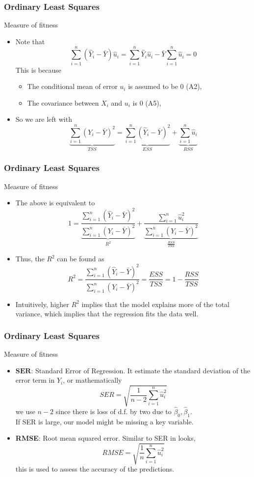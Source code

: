 \documentclass[compress]{beamer}
\begin{document}
\begin{frame}
\frametitle{Ordinary Least Squares}
Measure of fitness
\begin{itemize}
\item Note that 
\[
\sum_{i=1}^n(\hat{Y}_i - \bar{Y}) \hat{u}_i=\sum_{i=1}^n\hat{Y}_i{\hat{u}}_i-\bar{Y}\sum_{i=1}^n\hat{u}_i  =0
\]
This is because 
\begin{itemize}
\item The conditional mean of error $u_i$ is assumed to be 0 (A2), 
\item The covariance between $X_i$ and $u_i$ is 0 (A5), 
\end{itemize}
\item So we are left with
\[
\underbrace{\sum_{i=1}^n (Y_i-\bar{Y})^2}_{TSS}= \underbrace{\sum_{i=1}^n (\hat{Y}_i - \bar{Y})^2}_{ESS}+\underbrace{\sum_{i=1}^n\hat{u}_i}_{RSS} 
\]
\end{itemize}
\end{frame}


\begin{frame}
\frametitle{Ordinary Least Squares}
Measure of fitness
\begin{itemize}
\item The above is equivalent to 
\[
1=\underbrace{\frac{\sum_{i=1}^n (\hat{Y}_i - \bar{Y})^2}{\sum_{i=1}^n (Y_i-\bar{Y})^2}}_{R^2} + \underbrace{\frac{\sum_{i=1}^n\hat{u}_i ^2 }{\sum_{i=1}^n (Y_i-\bar{Y})^2}}_{\frac{RSS}{TSS}}
\]
\item Thus, the $R^2$ can be found as
\[
R^2 = \frac{\sum_{i=1}^n (\hat{Y}_i - \bar{Y})^2}{\sum_{i=1}^n (Y_i-\bar{Y})^2} = \frac{ESS}{TSS} = 1-\frac{RSS}{TSS}
\]
\item Intuitively, higher $R^2$ implies that the model explains more of the total variance, which implies that the regression fits the data well. 

\end{itemize}
\end{frame}


\begin{frame}
\frametitle{Ordinary Least Squares}
Measure of fitness
\begin{itemize}
\item $\mathbf{SER}$: Standard Error of Regression. It estimate the standard deviation of the error term in $Y_i$, or mathematically
\[
SER = \sqrt{\frac{1}{n-2}\sum_{i=1}^n \hat{u}_i^2}
\]
we use $n-2$ since there is loss of d.f. by two due to $\hat{\beta}_0, \hat{\beta}_1$.\\
 If SER is large, our model might be missing a key variable.
 \item \textbf{RMSE}: Root mean squared error. Similar to SER in looks, 
\[
RMSE = \sqrt{\frac{1}{n}\sum_{i=1}^n \hat{u}_i^2}
\]
this is used to assess the accuracy of the predictions.
\end{itemize}
\end{frame}
\end{document}
